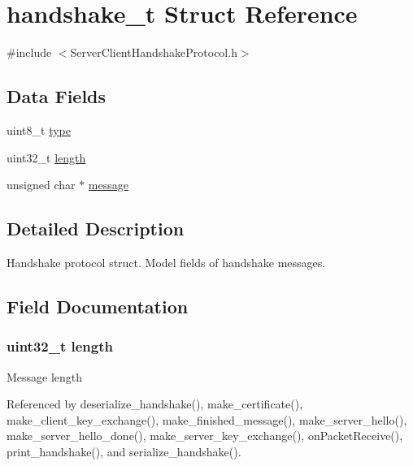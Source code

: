 \hypertarget{structhandshake__t}{}\section{handshake\+\_\+t Struct Reference}
\label{structhandshake__t}


{\ttfamily \#include $<$Server\+Client\+Handshake\+Protocol.\+h$>$}

\subsection*{Data Fields}
\begin{DoxyCompactItemize}
\item 
uint8\+\_\+t \hyperlink{structhandshake__t_a1d127017fb298b889f4ba24752d08b8e}{type}
\item 
uint32\+\_\+t \hyperlink{structhandshake__t_aebb70c2aab3407a9f05334c47131a43b}{length}
\item 
unsigned char $\ast$ \hyperlink{structhandshake__t_abb13456032cf48eaa794391b6ed937c7}{message}
\end{DoxyCompactItemize}


\subsection{Detailed Description}
Handshake protocol struct. Model fields of handshake messages. 

\subsection{Field Documentation}
\subsubsection[{\texorpdfstring{length}{length}}]{\setlength{\rightskip}{0pt plus 5cm}uint32\+\_\+t length}\hypertarget{structhandshake__t_aebb70c2aab3407a9f05334c47131a43b}{}\label{structhandshake__t_aebb70c2aab3407a9f05334c47131a43b}
Message length 

Referenced by deserialize\+\_\+handshake(), make\+\_\+certificate(), make\+\_\+client\+\_\+key\+\_\+exchange(), make\+\_\+finished\+\_\+message(), make\+\_\+server\+\_\+hello(), make\+\_\+server\+\_\+hello\+\_\+done(), make\+\_\+server\+\_\+key\+\_\+exchange(), on\+Packet\+Receive(), print\+\_\+handshake(), and serialize\+\_\+handshake().

